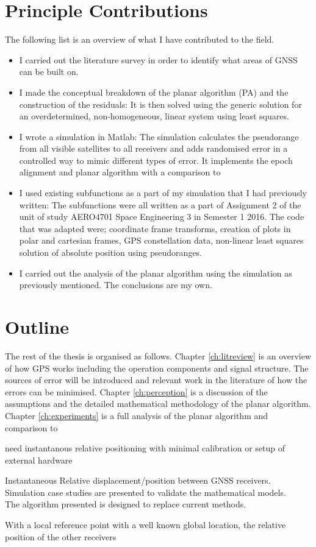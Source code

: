 \section{Principle Contributions}
The following list is an overview of what I have contributed to the field. 
\begin{itemize}
\item I carried out the literature survey in order to identify what areas of GNSS can be built on.
\item I made the conceptual breakdown of the planar algorithm (PA) and the construction of the residuals: It is then solved using the generic solution for an overdetermined, non-homogeneous, linear system using least squares.
\item I wrote a simulation in Matlab: The simulation calculates the pseudorange from all visible satellites to all receivers and adds randomised error in a controlled way to mimic different types of error. It implements the epoch alignment and planar algorithm with a comparison to 
\item I used existing subfunctions as a part of my simulation that I had previously written: The subfunctions were all written as a part of Assignment 2 of the unit of study AERO4701 Space Engineering 3 in Semester 1 2016. The code that was adapted were; coordinate frame transforms, creation of plots in polar and cartesian frames, GPS constellation data, non-linear least squares solution of absolute position using pseudoranges.
\item I carried out the analysis of the planar algorithm using the simulation as previously mentioned. The conclusions are my own.
\end{itemize}


\section{Outline}
The rest of the thesis is organised as follows. Chapter \ref{ch:litreview} is an overview of how GPS works including the operation components and signal structure. The sources of error will be introduced and relevant work in the literature of how the errors can be minimised. Chapter \ref{ch:perception} is a discussion of the assumptions and the detailed mathematical methodology of the planar algorithm. Chapter \ref{ch:experiments} is a full analysis of the planar algorithm and comparison to 




need instantanous relative positioning with minimal calibration or setup of external hardware

Instantaneous Relative displacement/position between GNSS receivers.\\
Simulation case studies are presented to validate the mathematical models.\\

The algorithm presented is designed to replace current methods.

With a local reference point with a well known global location, the relative position of the other receivers 